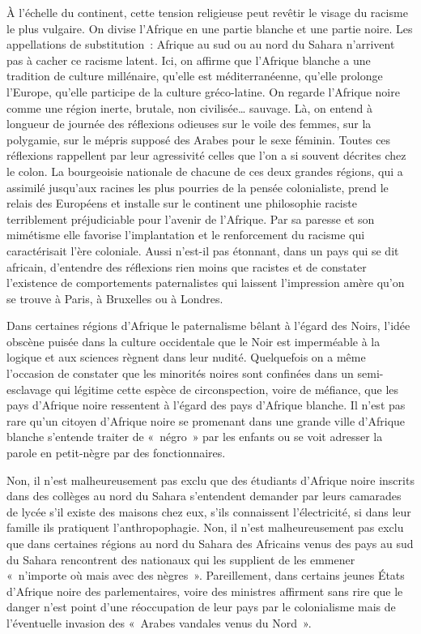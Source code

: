 \documentclass[french,twoside]{book} %
\begin{document}
\noindent À l’échelle du continent, cette tension religieuse peut revêtir le visage du racisme le plus vulgaire. On divise l’Afrique en une partie blanche et une partie noire. Les appellations de substitution : Afrique au sud ou au nord du Sahara n’arrivent pas à cacher ce racisme latent. Ici, on affirme que l’Afrique blanche a une tradition de culture millénaire, qu’elle est méditerranéenne, qu’elle prolonge l’Europe, qu’elle participe de la culture gréco-latine. On regarde l’Afrique noire comme une région inerte, brutale, non civilisée… sauvage. Là, on entend à longueur de journée des réflexions odieuses sur le voile des femmes, sur la polygamie, sur le mépris supposé des Arabes pour le sexe féminin. Toutes ces réflexions rappellent par leur agressivité celles que l’on a si souvent décrites chez le colon. La bourgeoisie nationale de chacune de ces deux grandes régions, qui a assimilé jusqu’aux racines les plus pourries de la pensée colonialiste, prend le relais   des Européens et installe sur le continent une philosophie raciste terriblement préjudiciable pour l’avenir de l’Afrique. Par sa paresse et son mimétisme elle favorise l’implantation et le renforcement du racisme qui caractérisait l’ère coloniale. Aussi n’est-il pas étonnant, dans un pays qui se dit africain, d’entendre des réflexions rien moins que racistes et de constater l’existence de comportements paternalistes qui laissent l’impression amère qu’on se trouve à Paris, à Bruxelles ou à Londres.\par
\bigbreak
\noindent Dans certaines régions d’Afrique le paternalisme bêlant à l’égard des Noirs, l’idée obscène puisée dans la culture occidentale que le Noir est imperméable à la logique et aux sciences règnent dans leur nudité. Quelquefois on a même l’occasion de constater que les minorités noires sont confinées dans un semi-esclavage qui légitime cette espèce de circonspection, voire de méfiance, que les pays d’Afrique noire ressentent à l’égard des pays d’Afrique blanche. Il n’est pas rare qu’un citoyen d’Afrique noire se promenant dans une grande ville d’Afrique blanche s’entende traiter de « négro » par les enfants ou se voit adresser la parole en petit-nègre par des fonctionnaires.\par
Non, il n’est malheureusement pas exclu que des étudiants d’Afrique noire inscrits dans des collèges au nord du Sahara s’entendent demander par leurs camarades de lycée s’il existe des maisons chez eux, s’ils connaissent l’électricité, si dans leur famille ils pratiquent l’anthropophagie. Non, il n’est malheureusement pas exclu que dans certaines régions au nord du Sahara des Africains venus des pays au sud du Sahara rencontrent des nationaux qui les supplient de les emmener « n’importe où mais avec des nègres ». Pareillement, dans certains jeunes États d’Afrique noire des parlementaires, voire des ministres affirment sans rire que le danger n’est point d’une réoccupation de leur pays par le colonialisme mais de l’éventuelle invasion des « Arabes vandales venus du Nord ».\par
\end{document}
